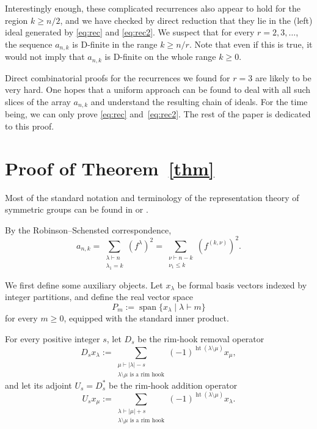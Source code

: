 \documentclass[a4paper,draft]{amsart}
\DeclareMathOperator{\rht}{ht}
\begin{document}
Interestingly enough, these complicated recurrences also appear to hold for the
region $k\geq n/2$, and we have checked by direct reduction that they lie in the
(left) ideal generated by \eqref{eq:rec} and \eqref{eq:rec2}. We suspect that
for every $r=2,3,\dots$, the sequence $a_{n,k}$ is D-finite in the range $k\geq n/r$.
Note that even if this is true, it would not imply that $a_{n,k}$ is D-finite on
the whole range $k\geq0$.

Direct combinatorial proofs for the recurrences we found for $r=3$ are likely to be
very hard. One hopes that a uniform approach can be found to deal with all such
slices of the array $a_{n,k}$ and understand the resulting chain of ideals.
For the time being, we can only prove \eqref{eq:rec} and~\eqref{eq:rec2}.
The rest of the paper is dedicated to this proof. 

\section{Proof of Theorem~\ref{thm}}

Most of the standard notation and terminology of the representation theory of symmetric groups can be found in \cite{SaganSymmetricGroup} or \cite{StanleyEC2}.

By the Robinson--Schensted correspondence,
\begin{equation}\label{eq:aRSK}
 a_{n,k}
 =\sum_{\substack{\lambda\vdash n\\ \lambda_1=k}}(f^\lambda)^2
 =\sum_{\substack{\nu\vdash n-k\\\nu_1\leq k}}
    (f^{(k,\nu)})^2.
\end{equation}

We first define some auxiliary objects.  Let $x_\lambda$ be formal
basis vectors indexed by integer partitions, and define the real vector
space
\[
P_m:=\operatorname{span}\{x_\lambda\mid\lambda\vdash m\}
\]
for every $m\geq0$, equipped with the standard inner product.

For every positive integer $s$, let $D_s$ be the rim-hook removal
operator
\[
D_sx_\lambda:=
\sum_{\substack{\mu\vdash |\lambda|-s\\
\lambda\setminus\mu\text{ is a rim hook}}}
(-1)^{\rht(\lambda\setminus\mu)}x_\mu,
\]
and let its adjoint $U_s=D_s^*$ be the rim-hook addition operator
\[
U_sx_\mu:=
\sum_{\substack{\lambda\vdash |\mu|+s\\
\lambda\setminus\mu\text{ is a rim hook}}}
(-1)^{\rht(\lambda\setminus\mu)}x_\lambda.
\]
\end{document}
